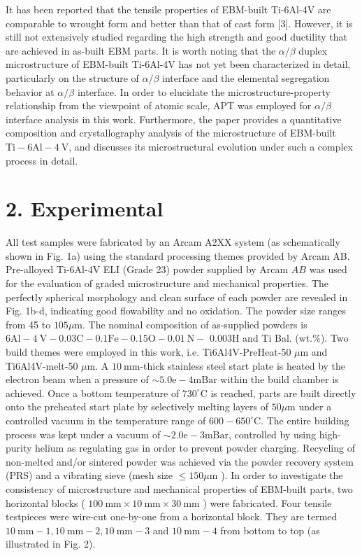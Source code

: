 \documentclass[10pt]{article}
\begin{document}
It has been reported that the tensile properties of EBM-built Ti-6Al-4V are comparable to wrought form and better than that of cast form [3]. However, it is still not extensively studied regarding the high strength and good ductility that are achieved in as-built EBM parts. It is worth noting that the $\alpha / \beta$ duplex microstructure of EBM-built Ti-6Al-4V has not yet been characterized in detail, particularly on the structure of $\alpha / \beta$ interface and the elemental segregation behavior at $\alpha / \beta$ interface. In order to elucidate the microstructure-property relationship from the viewpoint of atomic scale, APT was employed for $\alpha / \beta$ interface analysis in this work. Furthermore, the paper provides a quantitative composition and crystallography analysis of the microstructure of EBM-built $\mathrm{Ti}-6 \mathrm{Al}-4 \mathrm{~V}$, and discusses its microstructural evolution under such a complex process in detail.

\section*{2. Experimental}
All test samples were fabricated by an Arcam A2XX system (as schematically shown in Fig. 1a) using the standard processing themes provided by Arcam AB. Pre-alloyed Ti-6Al-4V ELI (Grade 23) powder supplied by Arcam $A B$ was used for the evaluation of graded microstructure and mechanical properties. The perfectly spherical morphology and clean surface of each powder are revealed in Fig. 1b-d, indicating good flowability and no oxidation. The powder size ranges from 45 to $105 \mu \mathrm{m}$. The nominal composition of as-supplied powders is $6 \mathrm{Al}-4 \mathrm{~V}-0.03 \mathrm{C}-0.1 \mathrm{Fe}-0.15 \mathrm{O}-0.01 \mathrm{~N}-$ $0.003 \mathrm{H}$ and Ti Bal. (wt.\%). Two build themes were employed in this work, i.e. Ti6Al4V-PreHeat-50 $\mu \mathrm{m}$ and Ti6Al4V-melt-50 $\mu \mathrm{m}$. A $10 \mathrm{~mm}$-thick stainless steel start plate is heated by the electron beam when a pressure of $\sim 5.0 \mathrm{e}-4 \mathrm{mBar}$ within the build chamber is achieved. Once a bottom temperature of $730^{\circ} \mathrm{C}$ is reached, parts are built directly onto the preheated start plate by selectively melting layers of $50 \mu \mathrm{m}$ under a controlled vacuum in the temperature range of $600-650^{\circ} \mathrm{C}$. The entire building process was kept under a vacuum of $\sim 2.0 \mathrm{e}-3 \mathrm{mBar}$, controlled by using high-purity helium as regulating gas in order to prevent powder charging. Recycling of non-melted and/or sintered powder was achieved via the powder recovery system (PRS) and a vibrating sieve (mesh size $\leqslant 150 \mu \mathrm{m}$ ). In order to investigate the consistency of microstructure and mechanical properties of EBM-built parts, two horizontal blocks ( $100 \mathrm{~mm} \times 10 \mathrm{~mm} \times 30 \mathrm{~mm}$ ) were fabricated. Four tensile testpieces were wire-cut one-by-one from a horizontal block. They are termed $10 \mathrm{~mm}-1,10 \mathrm{~mm}-2,10 \mathrm{~mm}-3$ and $10 \mathrm{~mm}-4$ from bottom to top (as illustrated in Fig. 2).
\end{document}
